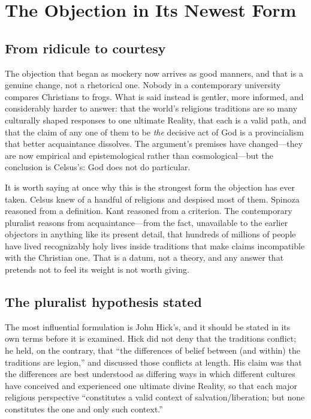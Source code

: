 \section{The Objection in Its Newest Form}

\subsection{From ridicule to courtesy}

The objection that began as mockery now arrives as good manners, and that is a genuine change, not a rhetorical one. Nobody in a contemporary university compares Christians to frogs. What is said instead is gentler, more informed, and considerably harder to answer: that the world's religious traditions are so many culturally shaped responses to one ultimate Reality, that each is a valid path, and that the claim of any one of them to be \emph{the} decisive act of God is a provincialism that better acquaintance dissolves. The argument's premises have changed---they are now empirical and epistemological rather than cosmological---but the conclusion is Celsus's: God does not do particular.

It is worth saying at once why this is the strongest form the objection has ever taken. Celsus knew of a handful of religions and despised most of them. Spinoza reasoned from a definition. Kant reasoned from a criterion. The contemporary pluralist reasons from acquaintance---from the fact, unavailable to the earlier objectors in anything like its present detail, that hundreds of millions of people have lived recognizably holy lives inside traditions that make claims incompatible with the Christian one. That is a datum, not a theory, and any answer that pretends not to feel its weight is not worth giving.

\subsection{The pluralist hypothesis stated}

The most influential formulation is John Hick's, and it should be stated in its own terms before it is examined. Hick did not deny that the traditions conflict; he held, on the contrary, that ``the differences of belief between (and within) the traditions are legion,'' and discussed those conflicts at length. His claim was that the differences are best understood as differing ways in which different cultures have conceived and experienced one ultimate divine Reality, so that each major religious perspective ``constitutes a valid context of salvation/liberation; but none constitutes the one and only such context.''

